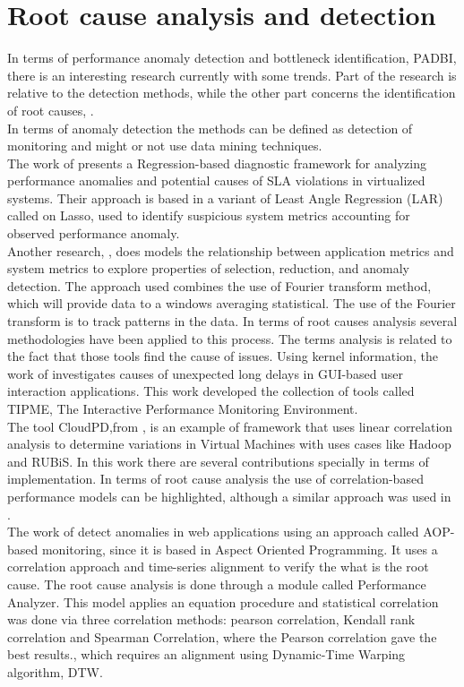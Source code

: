 \section{Root cause analysis and detection}
In terms of performance anomaly detection and bottleneck identification, PADBI, there is an interesting research currently with some trends. Part of the research is relative to the detection methods, while the other part concerns the identification of root causes, \cite{Chandola2009ADS15418801541882}.\\
In terms of anomaly detection the methods can be defined as detection of monitoring and might or not use data mining techniques. \\
The work of \cite{lasso} presents a Regression-based diagnostic framework for analyzing performance anomalies and potential causes of SLA violations in virtualized systems. Their approach is based in a variant of Least Angle Regression (LAR) called on Lasso, used to identify suspicious system metrics accounting for observed performance anomaly.\\
Another research, \cite{anomaly_detection_grid}, does models the relationship between application metrics and system metrics to explore properties of selection, reduction, and anomaly detection. The approach used combines the use of Fourier transform method, which will provide data to a windows averaging statistical. The use of the Fourier transform is to track patterns in the data.
In terms of root causes analysis several methodologies have been applied to this process. The terms analysis is related to the fact that those tools find the cause of issues.
Using kernel information, the work of \cite{tipme} investigates causes of unexpected long delays in GUI-based user interaction applications. This work developed the collection of tools called TIPME, The Interactive Performance Monitoring Environment. \\
The tool CloudPD,from \cite{cloudPD}, is an example of framework that uses linear correlation analysis to determine variations in Virtual Machines with uses cases like Hadoop and RUBiS. In this work there are several contributions specially in terms of implementation. In terms of root cause analysis the use of correlation-based performance models can be highlighted, although a similar approach was used in \cite{model_prob}.\\
The work of \cite{root_cause} detect anomalies in web applications using an approach called AOP-based monitoring, since it is based in Aspect Oriented Programming. It uses a correlation approach and time-series alignment to verify  the what is the root cause. The root cause analysis is done through a module called Performance Analyzer. This model applies an equation procedure and statistical correlation was done via three correlation methods: pearson correlation, Kendall rank correlation and Spearman Correlation, where the Pearson correlation gave the best results., which requires an alignment using Dynamic-Time Warping algorithm, DTW.\\
